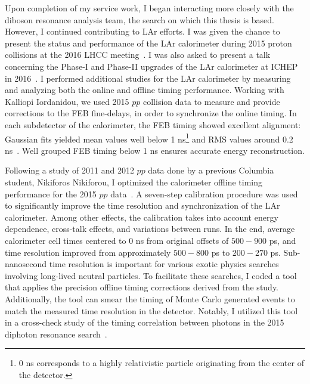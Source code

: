 Upon completion of my service work, I began interacting more closely with the diboson resonance analysis team, the search on which this thesis is based.
However, I continued contributing to LAr efforts. I was given the chance to present the status and performance of the LAr calorimeter during 2015 proton collisions at the 2016 LHCC meeting~\cite{lhcc_poster}. I was also asked to present a talk concerning the Phase-I and Phase-II upgrades of the LAr calorimeter at ICHEP in 2016~\cite{ryne_ichep_talk}. I performed additional studies for the LAr calorimeter by measuring and analyzing both the online and offline timing performance. Working with Kalliopi Iordanidou, we used 2015 $pp$ collision data to measure and provide corrections to the FEB fine-delays, in order to synchronize the online timing. In each subdetector of the calorimeter, the FEB timing showed excellent alignment: Gaussian fits yielded mean values well below 1 ns\footnote{
    0 ns corresponds to a highly relativistic particle originating from the center of the detector.
} and RMS values around 0.2 ns~\cite{LArCaloPublicResults2015}. Well grouped FEB timing below 1 ns ensures accurate energy reconstruction.

Following a study of 2011 and 2012 $pp$ data done by a previous Columbia student, Nikiforos Nikiforou, 
I optimized the calorimeter offline timing performance for the 2015 $pp$ data~\cite{LArTiming_2015}. A seven-step calibration procedure was used to significantly improve the time resolution and synchronization of the LAr calorimeter. Among other effects, the calibration takes into account energy dependence, cross-talk effects, and variations between runs. In the end, average calorimeter cell times centered to 0 ns from original offsets of $500-900$ ps, and time resolution improved from approximately $500-800$ ps to $200-270$ ps. Sub-nanosecond time resolution is important for various exotic physics searches involving long-lived neutral particles. To facilitate these searches, I coded a tool that applies the precision offline timing corrections derived from the study. Additionally, the tool can smear the timing of Monte Carlo generated events to match the measured time resolution in the detector. Notably, I utilized this tool in a cross-check study of the timing correlation between photons in the 2015 diphoton resonance search~\cite{diphoton_paper}.









